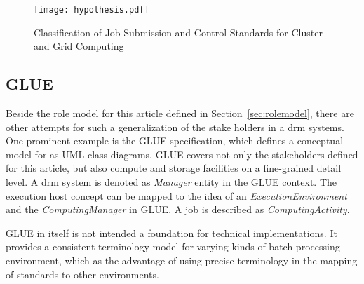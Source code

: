 \documentclass[twocolumn]{svjour3}       %
\begin{document}
\begin{figure}
  \texttt{[image: hypothesis.pdf]}
\caption{Classification of Job Submission and Control Standards for Cluster and Grid Computing}
\label{fig:hypothesis} 
\end{figure}


% 
%
%



\subsection{GLUE}

Beside the role model for this article defined in Section~\ref{sec:rolemodel}, there are other attempts for such a generalization of the stake holders in a \gls{drm} systems. One prominent example is the GLUE specification, which defines a conceptual model for  as UML class diagrams. GLUE covers not only the stakeholders defined for this article, but also compute and storage facilities on a fine-grained detail level. A \gls{drm} system is denoted as \emph{Manager} entity in the GLUE context. The execution host concept can be mapped to the idea of an \emph{ExecutionEnvironment} and the \emph{ComputingManager} in GLUE. A job is described as \emph{ComputingActivity}.


GLUE in itself is not intended a foundation for technical implementations. It provides a consistent terminology model for varying kinds of batch processing environment, which as the advantage of using precise terminology in the mapping of standards to other environments. 
\end{document}
